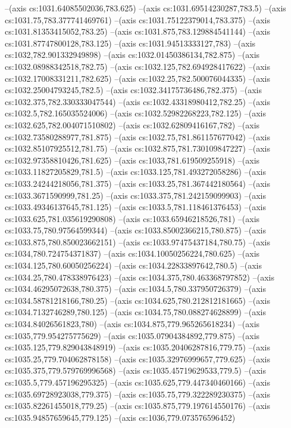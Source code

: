 --(axis cs:1031.64085502036,783.625)
--(axis cs:1031.69514230287,783.5)
--(axis cs:1031.75,783.377741469761)
--(axis cs:1031.75122379014,783.375)
--(axis cs:1031.81353415052,783.25)
--(axis cs:1031.875,783.129884541144)
--(axis cs:1031.87747800128,783.125)
--(axis cs:1031.94513333127,783)
--(axis cs:1032,782.901332949898)
--(axis cs:1032.01450386134,782.875)
--(axis cs:1032.08988342518,782.75)
--(axis cs:1032.125,782.694928417622)
--(axis cs:1032.17008331211,782.625)
--(axis cs:1032.25,782.500076044335)
--(axis cs:1032.25004793245,782.5)
--(axis cs:1032.34175736486,782.375)
--(axis cs:1032.375,782.330333047544)
--(axis cs:1032.43318980412,782.25)
--(axis cs:1032.5,782.165035524006)
--(axis cs:1032.52982268223,782.125)
--(axis cs:1032.625,782.004071510802)
--(axis cs:1032.62809416167,782)
--(axis cs:1032.73580288977,781.875)
--(axis cs:1032.75,781.861157677042)
--(axis cs:1032.85107925512,781.75)
--(axis cs:1032.875,781.730109847227)
--(axis cs:1032.97358810426,781.625)
--(axis cs:1033,781.619509255918)
--(axis cs:1033.11827205829,781.5)
--(axis cs:1033.125,781.493272058286)
--(axis cs:1033.24244218056,781.375)
--(axis cs:1033.25,781.367442180564)
--(axis cs:1033.3671590999,781.25)
--(axis cs:1033.375,781.242159099903)
--(axis cs:1033.49346137645,781.125)
--(axis cs:1033.5,781.118461376453)
--(axis cs:1033.625,781.035619290808)
--(axis cs:1033.65946218526,781)
--(axis cs:1033.75,780.97564599344)
--(axis cs:1033.85002366215,780.875)
--(axis cs:1033.875,780.850023662151)
--(axis cs:1033.97475437184,780.75)
--(axis cs:1034,780.724754371837)
--(axis cs:1034.10050256224,780.625)
--(axis cs:1034.125,780.60050256224)
--(axis cs:1034.22833897642,780.5)
--(axis cs:1034.25,780.478338976423)
--(axis cs:1034.375,780.463368797852)
--(axis cs:1034.46295072638,780.375)
--(axis cs:1034.5,780.337950726379)
--(axis cs:1034.58781218166,780.25)
--(axis cs:1034.625,780.212812181665)
--(axis cs:1034.7132746289,780.125)
--(axis cs:1034.75,780.088274628899)
--(axis cs:1034.84026561823,780)
--(axis cs:1034.875,779.965265618234)
--(axis cs:1035,779.954275775629)
--(axis cs:1035.07904384892,779.875)
--(axis cs:1035.125,779.829043848919)
--(axis cs:1035.20406287816,779.75)
--(axis cs:1035.25,779.704062878158)
--(axis cs:1035.32976999657,779.625)
--(axis cs:1035.375,779.579769996568)
--(axis cs:1035.45719629533,779.5)
--(axis cs:1035.5,779.457196295325)
--(axis cs:1035.625,779.447340460166)
--(axis cs:1035.69728923038,779.375)
--(axis cs:1035.75,779.322289230375)
--(axis cs:1035.82261455018,779.25)
--(axis cs:1035.875,779.197614550176)
--(axis cs:1035.94857659645,779.125)
--(axis cs:1036,779.073576596452)
